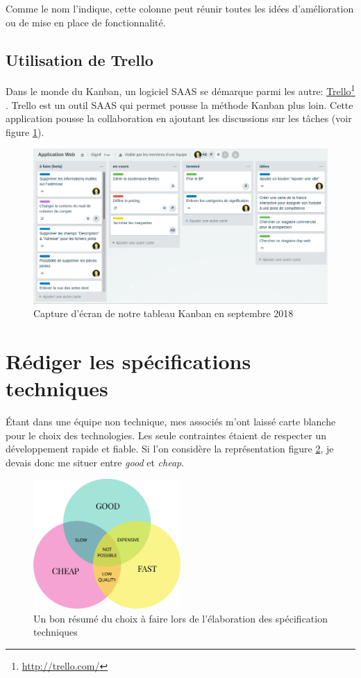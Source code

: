 \documentclass[]{report}
\newcommand\fnurl[2]{%
  \href{#1}{#2}\footnote{\url{#1}}%
}
\begin{document}
        Comme le nom l'indique, cette colonne peut réunir toutes les idées d'amélioration ou de mise en place de fonctionnalité.

    \subsection{Utilisation de Trello}

      Dans le monde du Kanban, un logiciel SAAS se démarque parmi les autre: \fnurl{http://trello.com/}{Trello}. Trello est un outil SAAS qui permet pousse la méthode Kanban plus loin. Cette application pousse la collaboration en ajoutant les discussions sur les tâches (voir figure \ref{fig:trello}).

      \begin{figure}
        \includegraphics[width=\linewidth]{img/trello.png}
        \caption{Capture d'écran de notre tableau Kanban en septembre 2018}
        \label{fig:trello}
      \end{figure}

  \section{Rédiger les spécifications techniques}

    Étant dans une équipe non technique, mes associés m'ont laissé carte blanche pour le choix des technologies. Les seule contraintes étaient de respecter un développement rapide et fiable. Si l'on considère la représentation figure \ref{fig:good_cheap_fast}, je devais donc me situer entre \textit{good} et \textit{cheap}.

    \begin{figure}
      \centering
      \includegraphics[width=0.5\textwidth]{img/good_cheap_fast.png}
      \caption{Un bon résumé du choix à faire lors de l'élaboration des spécification techniques}
      \label{fig:good_cheap_fast}
    \end{figure}
\end{document}
